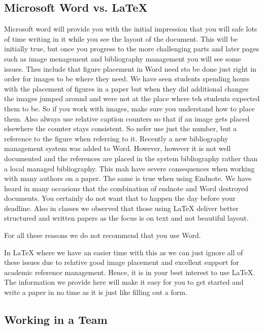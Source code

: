 \subsection{Microsoft Word vs. \LaTeX}\label{microsoft-word}

Microsoft word will provide you with the initial impression that you
will safe lots of time writing in it while you see the layout of the
document. This will be initially true, but once you progress to the
more challenging parts and later pages such as image menagement and
bibliography management you will see some issues. Thes include that
figure placement in Word need sto be done just right in order for images
to be where they need. We have seen students spending hours with the
placement of figures in a paper but when they did additional changes the
images jumped around and were not at the place where teh students
expected them to be. So if you work with images, make sure you
understand how to place them. Also always use relative caption counters
so that if an image gets placed elsewhere the counter stays consistent.
So nefer use just the number, but a reference to the figure when referring
to it. Recently a new bibliography management system was added to Word.
However, however it is not well documented and the references are placed
in the system bibliography rather than a local managed bibliography.
This mah have severe consequences when working with many authors on a
paper. The same is true when using Endnote. We have heard in many
occasions that the combination of endnote and Word destroyed documents.
You certainly do not want that to happen the day before your deadline.
Also in classes we observed that those using LaTeX deliver better
structured and written papers as the focus is on text and not beautiful
layout.

For all these reasons we do not recommend that you use Word.

In LaTeX where we have an easier time with this as we can just ignore
all of these issues due to relative good image placement and excellent
support for academic reference management. Hence, it is in your best
interest to use LaTeX. The information we provide here will make it easy
for you to get started and write a paper in no time as it is just like
filling out a form.

\subsection{Working in a Team}\label{working-in-a-team}

